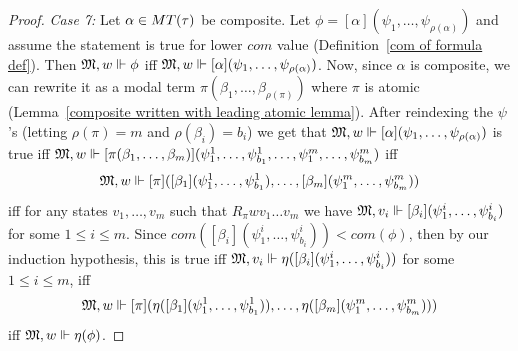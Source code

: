 \begin{proof}
    
    \par \textit{Case 7:} Let $\alpha\in MT(\tau)$ be composite. Let $\phi = [\alpha](\psi_1,\ldots,\psi_{\rho(\alpha)})$ and assume the statement is true for lower $com$ value (Definition~\ref{com of formula def}). Then $\mathfrak{M},w\Vdash\phi$ iff $\mathfrak{M},w\Vdash[\alpha](\psi_1,\ldots,\psi_{\rho(\alpha)})$. Now, since $\alpha$ is composite, we can rewrite it as a modal term $\pi(\beta_1,\ldots,\beta_{\rho(\pi)})$ where $\pi$ is atomic (Lemma~\ref{composite written with leading atomic lemma}). After reindexing the $\psi$'s (letting $\rho(\pi) = m$ and $\rho(\beta_i) = b_i$) we get that $\mathfrak{M},w\Vdash[\alpha](\psi_1,\ldots,\psi_{\rho(\alpha)})$ is true iff $\mathfrak{M},w\Vdash[\pi(\beta_1,\ldots,\beta_m)](\psi_1^1,\ldots,\psi_{b_1}^1,\ldots,\psi_1^m,\ldots,\psi_{b_m}^m)$ iff
    $$\mathfrak{M},w\Vdash[\pi]([\beta_1](\psi_1^1,\ldots,\psi_{b_1}^1),\ldots,[\beta_m](\psi_1^m,\ldots,\psi_{b_m}^m))$$ iff for any states $v_1,\ldots,v_m$ such that $R_\pi wv_1\ldots v_m$ we have $\mathfrak{M},v_i\Vdash[\beta_i](\psi_1^i,\ldots,\psi_{b_i}^i)$ for some $1\leq i \leq m$. Since $com([\beta_i](\psi_1^i,\ldots,\psi_{b_i}^i))<com(\phi)$, then by our induction hypothesis, this is true iff  $\mathfrak{M},v_i\Vdash\eta([\beta_i](\psi_1^i,\ldots,\psi_{b_i}^i))$ for some $1\leq i \leq m$, iff $$\mathfrak{M},w\Vdash[\pi](\eta([\beta_1](\psi_1^1,\ldots, \psi_{b_1}^1)),\ldots,\eta([\beta_m](\psi_1^m, \ldots,\psi_{b_m}^m)))$$ iff $\mathfrak{M},w\Vdash\eta(\phi)$.
\end{proof}

